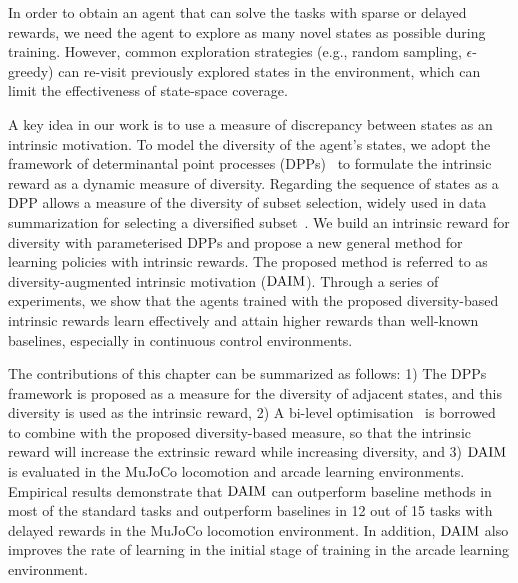 In order to obtain an agent that can solve the tasks with sparse or delayed rewards, we need the agent to explore as many novel states as possible during training. However, common exploration strategies ({e.g.}, random sampling, $\epsilon$-greedy) can re-visit previously explored states in the environment, which can limit the effectiveness of state-space coverage.

A key idea in our work is to use a measure of discrepancy between states as an intrinsic motivation. To model the diversity of the agent's states, we adopt the framework of determinantal point processes (DPPs)~\cite{kulesza2012determinantal} to formulate the intrinsic reward as a dynamic measure of diversity. Regarding the sequence of states as a DPP allows a measure of the diversity of subset selection, widely used in data summarization for selecting a diversified subset~\cite{gong2014diverse}. We build an intrinsic reward for diversity with parameterised DPPs and propose a new general method for learning policies with intrinsic rewards. The proposed method is referred to as diversity-augmented intrinsic motivation ($\text{DAIM}$). Through a series of experiments, we show that the agents trained with the proposed diversity-based intrinsic rewards learn effectively and attain higher rewards than well-known baselines, especially in continuous control environments.

The contributions of this chapter can be summarized as follows: 1) The DPPs framework is proposed as a measure for the diversity of adjacent states, and this diversity is used as the intrinsic reward, 2) A bi-level optimisation~\cite{zheng2018learning} is borrowed to combine with the proposed diversity-based measure, so that the intrinsic reward will increase the extrinsic reward while increasing diversity, and 3) $\text{DAIM}$ is evaluated in the MuJoCo locomotion and arcade learning environments. Empirical results demonstrate that $\text{DAIM}$ can outperform baseline methods in most of the standard tasks and outperform baselines in 12 out of 15 tasks with delayed rewards in the MuJoCo locomotion environment. In addition, $\text{DAIM}$ also improves the rate of learning in the initial stage of training in the arcade learning environment.
\newpage

